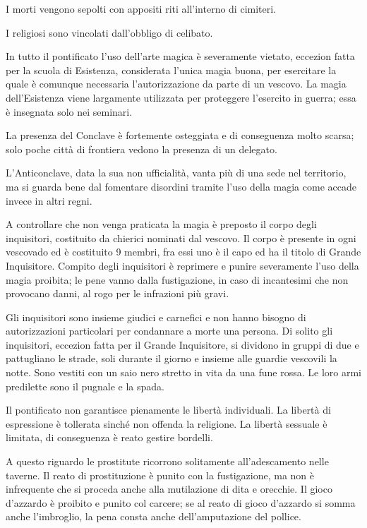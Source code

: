 I morti vengono sepolti con appositi riti all'interno di cimiteri.

I religiosi sono vincolati dall'obbligo di celibato.

\Magia In tutto il pontificato l'uso dell'arte magica \`e severamente
vietato, eccezion fatta per la scuola di Esistenza, considerata
l'unica magia buona, per esercitare la quale \`e comunque necessaria
l'autorizzazione da parte di un vescovo.  La magia dell'Esistenza
viene largamente utilizzata per proteggere l'esercito in guerra; essa
\`e insegnata solo nei seminari.

La presenza del Conclave \`e fortemente osteggiata e di conseguenza
molto scarsa; solo poche citt\`a di frontiera vedono la presenza di un
delegato.

L'Anticonclave, data la sua non ufficialit\`a, vanta pi\`u di una
sede nel territorio, ma si guarda bene dal fomentare disordini tramite
l'uso della magia come accade invece in altri regni.  

A controllare che non venga praticata la magia \`e preposto il corpo
degli inquisitori, costituito da chierici nominati dal vescovo. Il
corpo \`e presente in ogni vescovado ed \`e costituito 9 membri,
fra essi uno \`e il capo ed ha il titolo di Grande Inquisitore.
Compito degli inquisitori \`e reprimere e punire severamente l'uso
della magia proibita; le pene vanno dalla fustigazione, in caso di
incantesimi che non provocano danni, al rogo per le infrazioni pi\`u
gravi.

Gli inquisitori sono insieme giudici e carnefici e non hanno bisogno
di autorizzazioni particolari per condannare a morte una persona. Di
solito gli inquisitori, eccezion fatta per il Grande Inquisitore, si
dividono in gruppi di due e pattugliano le strade, soli durante il
giorno e insieme alle guardie vescovili la notte. Sono vestiti con un
saio nero stretto in vita da una fune rossa. Le loro armi predilette 
sono il pugnale e la spada.

\Moda Il pontificato non garantisce pienamente le libert\`a
individuali. La libert\`a di espressione \`e tollerata sinch\'e non
offenda la religione. La libert\`a sessuale \`e limitata, di
conseguenza \`e reato gestire bordelli.

A questo riguardo le prostitute ricorrono solitamente all'adescamento
nelle taverne. Il reato di prostituzione \`e punito con la
fustigazione, ma non \`e infrequente che si proceda anche alla
mutilazione di dita e orecchie. Il gioco d'azzardo \`e proibito e
punito col carcere; se al reato di gioco d'azzardo si somma anche
l'imbroglio, la pena consta anche dell'amputazione del pollice.

